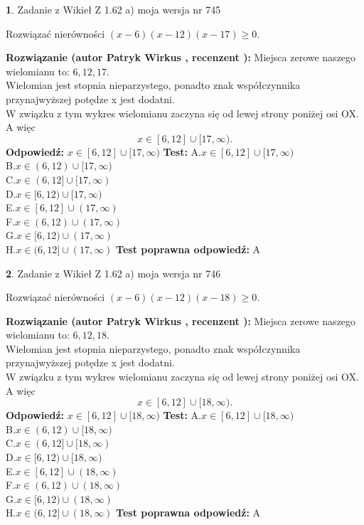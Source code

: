 \documentclass[12pt, a4paper]{article}
\theoremstyle{definition} %
\newtheorem{zad}{}
\newcommand{\zadStart}[1]{\begin{zad}#1\newline}
\newcommand{\zadStop}{\end{zad}}
\newcommand{\rozwStart}[2]{\noindent \textbf{Rozwiązanie (autor #1 , recenzent #2): }\newline}
\newcommand{\rozwStop}{\newline}
\newcommand{\odpStart}{\noindent \textbf{Odpowiedź:}\newline}
\newcommand{\odpStop}{\newline}
\newcommand{\testStart}{\noindent \textbf{Test:}\newline}
\newcommand{\testStop}{\newline}
\newcommand{\kluczStart}{\noindent \textbf{Test poprawna odpowiedź:}\newline}
\newcommand{\kluczStop}{\newline}
\begin{document}
\zadStart{Zadanie z Wikieł Z 1.62 a) moja wersja nr 745}

Rozwiązać nierówności $(x-6)(x-12)(x-17)\ge0$.
\zadStop
\rozwStart{Patryk Wirkus}{}
Miejsca zerowe naszego wielomianu to: $6, 12, 17$.\\
Wielomian jest stopnia nieparzystego, ponadto znak współczynnika przy\linebreak najwyższej potędze x jest dodatni.\\ W związku z tym wykres wielomianu zaczyna się od lewej strony poniżej osi OX. A więc $$x \in [6,12] \cup [17,\infty).$$
\rozwStop
\odpStart
$x \in [6,12] \cup [17,\infty)$
\odpStop
\testStart
A.$x \in [6,12] \cup [17,\infty)$\\
B.$x \in (6,12) \cup [17,\infty)$\\
C.$x \in (6,12] \cup [17,\infty)$\\
D.$x \in [6,12) \cup [17,\infty)$\\
E.$x \in [6,12] \cup (17,\infty)$\\
F.$x \in (6,12) \cup (17,\infty)$\\
G.$x \in [6,12) \cup (17,\infty)$\\
H.$x \in (6,12] \cup (17,\infty)$
\testStop
\kluczStart
A
\kluczStop



\zadStart{Zadanie z Wikieł Z 1.62 a) moja wersja nr 746}

Rozwiązać nierówności $(x-6)(x-12)(x-18)\ge0$.
\zadStop
\rozwStart{Patryk Wirkus}{}
Miejsca zerowe naszego wielomianu to: $6, 12, 18$.\\
Wielomian jest stopnia nieparzystego, ponadto znak współczynnika przy\linebreak najwyższej potędze x jest dodatni.\\ W związku z tym wykres wielomianu zaczyna się od lewej strony poniżej osi OX. A więc $$x \in [6,12] \cup [18,\infty).$$
\rozwStop
\odpStart
$x \in [6,12] \cup [18,\infty)$
\odpStop
\testStart
A.$x \in [6,12] \cup [18,\infty)$\\
B.$x \in (6,12) \cup [18,\infty)$\\
C.$x \in (6,12] \cup [18,\infty)$\\
D.$x \in [6,12) \cup [18,\infty)$\\
E.$x \in [6,12] \cup (18,\infty)$\\
F.$x \in (6,12) \cup (18,\infty)$\\
G.$x \in [6,12) \cup (18,\infty)$\\
H.$x \in (6,12] \cup (18,\infty)$
\testStop
\kluczStart
A
\kluczStop
\end{document}
